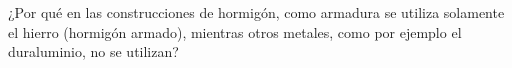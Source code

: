
¿Por qué en las construcciones de hormigón, como armadura se utiliza solamente el hierro (hormigón armado), mientras otros metales, como por ejemplo el duraluminio, no se utilizan?